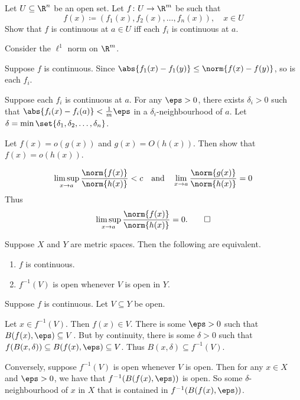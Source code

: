 \begin{exercise} \label{thm:cont:Rn}
    Let $U \subseteq \R^n$ be an open set.
    Let $f\colon U \to \R^m$ be such that \[
        f(x) \coloneq (f_1(x), f_2(x), \dots, f_n(x)), \quad x \in U
    \] Show that $f$ is continuous at $a \in U$ iff each $f_i$ is continuous
    at $a$.
\end{exercise}
\begin{solution}
    Consider the $\ell^1$ norm on $\R^m$.

    Suppose $f$ is continuous.
    Since $\abs{f_1(x) - f_1(y)} \le \norm{f(x) - f(y)}$, so is
    each $f_i$.

    Suppose each $f_i$ is continuous at $a$.
    For any $\eps > 0$, there exists $\delta_i > 0$ such that
    $\abs{f_i(x) - f_i(a)} < \frac1m \eps$ in a
    $\delta_i$-neighbourhood of $a$.
    Let $\delta = \min\set{\delta_1, \delta_2, \dots, \delta_n}$.
\end{solution}

\begin{exercise}
    Let $f(x) = o(g(x))$ and $g(x) = O(h(x))$.
    Then show that $f(x) = o(h(x))$.
\end{exercise}
\begin{solution}
    \[
        \limsup_{x \to a} \frac{\norm{f(x)}}{\norm{h(x)}} < c
        \quad \text{and} \quad
        \lim_{x \to a} \frac{\norm{g(x)}}{\norm{h(x)}} = 0
    \] Thus \[
        \limsup_{x \to a} \frac{\norm{f(x)}}{\norm{h(x)}} = 0. \qedhere
    \]
\end{solution}

\begin{proposition} \label{prp:cont-open}
    Suppose $X$ and $Y$ are metric spaces.
    Then the following are equivalent.
    \begin{enumerate}
        \item $f$ is continuous.
        \item $f^{-1}(V)$ is open whenever $V$ is open in $Y$.
    \end{enumerate}
\end{proposition}
\begin{solution}
    Suppose $f$ is continuous.
    Let $V \subseteq Y$ be open.

    Let $x \in f^{-1}(V)$.
    Then $f(x) \in V$.
    There is some $\eps > 0$ such that
    $B(f(x), \eps) \subseteq V$.
    But by continuity, there is some $\delta > 0$ such that
    $f(B(x, \delta)) \subseteq B(f(x), \eps) \subseteq V$.
    Thus $B(x, \delta) \subseteq f^{-1}(V)$.

    Conversely, suppose $f^{-1}(V)$ is open whenever $V$ is open.
    Then for any $x \in X$ and $\eps > 0$, we have
    that $f^{-1}(B(f(x), \eps))$ is open.
    So some $\delta$-neighbourhood of $x$ in $X$ that is contained
    in $f^{-1}(B(f(x), \eps))$.
\end{solution}
